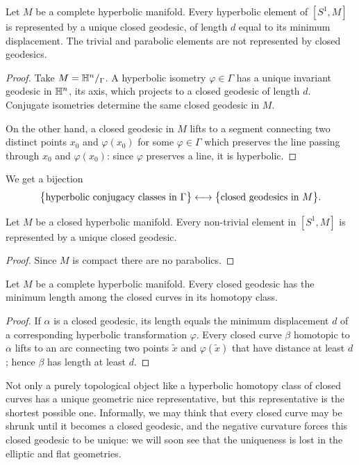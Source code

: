 \begin{prop} \label{unique:closed:geodesic:prop}
Let $M$ be a complete hyperbolic manifold. Every hyperbolic element of $[S^1, M]$ is represented by a unique closed geodesic, of length $d$ equal to its minimum displacement. The trivial and parabolic elements are not represented by closed geodesics.
\end{prop}
\begin{proof}
Take $M=\mathbb{H}^n/_\Gamma$. A hyperbolic isometry $\varphi \in \Gamma$ has a unique invariant geodesic in $\mathbb{H}^n$, its axis, which projects to a closed geodesic of length $d$. Conjugate isometries determine the same closed geodesic in $M$.

On the other hand, a closed geodesic in $M$ lifts to a segment connecting two distinct points $x_0$ and $\varphi(x_0)$ for some $\varphi\in \Gamma$ which preserves the line passing through $x_0$ and $\varphi(x_0)$: since $\varphi$ preserves a line, it is hyperbolic.
\end{proof}
We get a bijection
$$\big\{{\rm hyperbolic\ conjugacy\ classes\ in\ }\Gamma\big\} \longleftrightarrow \big\{ {\rm closed\ geodesics\ in\ } M \big\}.$$

\begin{cor} \label{unique:closed:geodesic:cor}
Let $M$ be a closed hyperbolic manifold. Every non-trivial element in $[S^1, M]$ is represented by a unique closed geodesic.
\end{cor}
\begin{proof}
Since $M$ is compact there are no parabolics.
\end{proof}

\begin{cor} \label{minimum:cor}
Let $M$ be a complete hyperbolic manifold. Every closed geodesic has the minimum length among the closed curves in its homotopy class.
\end{cor}
\begin{proof}
If $\alpha$ is a closed geodesic, its length equals the minimum displacement $d$ of a corresponding hyperbolic transformation $\varphi$. Every closed curve $\beta$ homotopic to $\alpha$ lifts to an arc connecting two points $\tilde x$ and $\varphi(\tilde x)$ that have distance at least $d$; hence $\beta$ has length at least $d$.
\end{proof}

Not only a purely topological object like a hyperbolic homotopy class of closed curves has a unique geometric nice representative, but this representative is the shortest possible one. Informally, we may think that every closed curve may be shrunk until it becomes a closed geodesic, and the negative curvature forces this closed geodesic to be unique: we will soon see that the uniqueness is lost in the elliptic and flat geometries.

